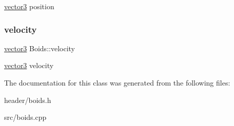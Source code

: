 \mbox{\hyperlink{structvector3}{vector3}} position \mbox{\label{class_boids_a66fd56202c1a8acba0829d1e354dd9f2}} 
\subsubsection{\texorpdfstring{velocity}{velocity}}
{\footnotesize\ttfamily \mbox{\hyperlink{structvector3}{vector3}} Boids\+::velocity}

\mbox{\hyperlink{structvector3}{vector3}} velocity 

The documentation for this class was generated from the following files\+:\begin{DoxyCompactItemize}
\item 
header/boids.\+h\item 
src/boids.\+cpp\end{DoxyCompactItemize}
